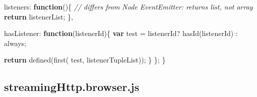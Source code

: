 \documentclass[12pt, ]{article}
\newenvironment{Shaded}{}{}
\newcommand{\KeywordTok}[1]{\textcolor[rgb]{0.00,0.44,0.13}{\textbf{{#1}}}}
\newcommand{\DataTypeTok}[1]{\textcolor[rgb]{0.56,0.13,0.00}{{#1}}}
\newcommand{\CommentTok}[1]{\textcolor[rgb]{0.38,0.63,0.69}{\textit{{#1}}}}
\newcommand{\FunctionTok}[1]{\textcolor[rgb]{0.02,0.16,0.49}{{#1}}}
\newcommand{\NormalTok}[1]{{#1}}
\begin{document}
\begin{Shaded}
\begin{Highlighting}[]
      \DataTypeTok{listeners}\NormalTok{: }\KeywordTok{function}\NormalTok{()\{}
         \CommentTok{// differs from Node EventEmitter: returns list, not array}
         \KeywordTok{return} \NormalTok{listenerList;}
      \NormalTok{\},}
      
      \DataTypeTok{hasListener}\NormalTok{: }\KeywordTok{function}\NormalTok{(listenerId)\{}
         \KeywordTok{var} \NormalTok{test = listenerId? }\FunctionTok{hasId}\NormalTok{(listenerId) : always;}
      
         \KeywordTok{return} \FunctionTok{defined}\NormalTok{(}\FunctionTok{first}\NormalTok{( test, listenerTupleList));}
      \NormalTok{\}}
   \NormalTok{\};}
\NormalTok{\}}
\end{Highlighting}
\end{Shaded}

\pagebreak

\subsection{streamingHttp.browser.js}\label{headerux5fstreamingHttp.browser}

\label{src_streamingHttp.browser}
\end{document}
